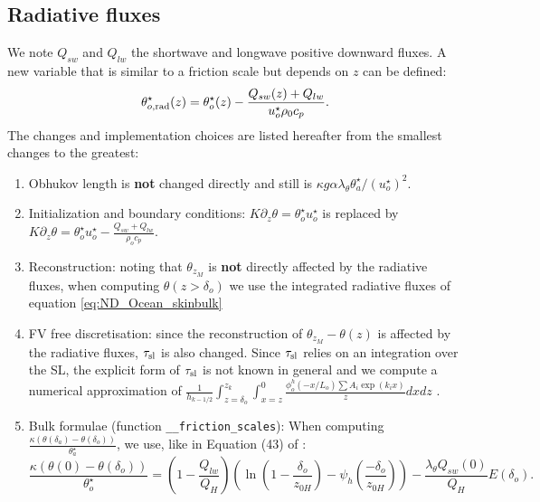 \subsection{Radiative fluxes}
\label{sec:ND_Ocean_radiativeFluxes}
We note $Q_{sw}$ and $Q_{lw}$ the shortwave and longwave positive
downward fluxes. A new variable that is similar to a friction
scale but depends on $z$ can be defined:
\begin{equation}
\theta^\star_{o, \rm rad}(z) =
	\theta^\star_{o}(z) -
	\frac{Q_{sw}(z) + Q_{lw}}{u^{\star}_o\rho_0 c_p}.
\end{equation}
The changes and implementation choices are listed hereafter from
the smallest changes to the greatest:
\begin{enumerate}
	\item Obhukov length is \textbf{not} changed directly and
		still is $\kappa g \alpha \lambda_\theta
		\theta^\star_a / (u^\star_o)^2$.
	\item Initialization and boundary conditions:
		$K\partial_z \theta = \theta^{\star}_o u^{\star}_o$
		is replaced by
		$K\partial_z \theta = \theta^{\star}_o u^{\star}_o
		- \frac{Q_{sw} + Q_{lw}}{\rho_o c_p}$.
	\item Reconstruction: noting that $\theta_{z_M}$ is
		\textbf{not} directly affected by the
		radiative fluxes, when computing $\theta(z>\delta_o)$
		we use the integrated radiative fluxes of
		equation \eqref{eq:ND_Ocean_skinbulk}
	\item FV free discretisation: since the reconstruction
		of $\theta_{z_M} - \theta(z)$ is affected by
		the radiative fluxes, $\tau_{\rm sl}$ is also
		changed. Since $\tau_{\rm sl}$ relies on an
		integration over the SL, the explicit form
		of $\tau_{\rm sl}$ is not known in general
		and we compute a numerical approximation of
		$\frac{1}{h_{k-1/2}}\int_{z=\delta_o}^{z_k}
		\int_{x=z}^0 \frac{\phi^h_o(-x/L_o)
		\sum A_i \exp (k_i x)
		}{z}dx dz$
		.
	\item Bulk formulae (function \verb|__friction_scales|):
		When computing
		$\frac{\kappa (\theta(\delta_a) - \theta(\delta_o))}
		{\theta_a^{\star}}$,
		we use, like in
		Equation (43) of \citep{pelletier2021two}:
	\begin{equation}
		\label{eq:ND_Ocean_skinbulk}
		\frac{\kappa (\theta(0) - \theta(\delta_o))}
		{\theta_o^{\star}} = (1 -
		\frac{Q_{lw}}{Q_H})
		\left(\ln (1 - \frac{\delta_o}{z_{0H}}) -
		\psi_h(\frac{-\delta_o}{z_{0H}})\right)
		- \frac{\lambda_\theta Q_{sw}(0)}
		{Q_H} E(\delta_o)
		.
	\end{equation}
\end{enumerate}
